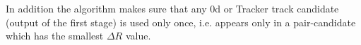 
In addition the algorithm makes sure that 
any \p0d or Tracker track candidate (output of the first stage) 
is used only once, i.e. appears only in a pair-candidate which has the 
smallest $\Delta R$ value.




